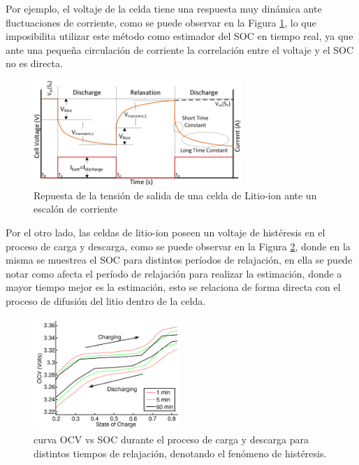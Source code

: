 \documentclass[10pt,a4paper]{article}
\begin{document}
\noindent Por ejemplo, el voltaje de la celda tiene una respuesta muy din\'amica
ante fluctuaciones de corriente, como se puede observar en la Figura
\ref{relaxation_ocv}, lo que imposibilita utilizar este m\'etodo como estimador
del \acrshort{SOC} en tiempo real, ya que ante una pequeña circulaci\'on de
corriente la correlaci\'on entre el voltaje y el \acrshort{SOC} no es directa.

\begin{figure}[h!]
    \begin{center}
        \includegraphics[width=0.7\textwidth]{ocv_relaxation.png}
        \caption{Repuesta de la tensi\'on de salida de una celda de Litio-ion
        ante un escal\'on de corriente}
        \label{relaxation_ocv}
    \end{center}
\end{figure}

\noindent Por el otro lado, las celdas de litio-ion poseen un voltaje de
hist\'eresis en el proceso de carga y descarga, como se puede observar en la
Figura \ref{histeresis_plot}, donde en la misma se muestrea el \acrshort{SOC}
para distintos per\'iodos de relajaci\'on, en ella se puede notar como
afecta el per\'iodo de relajaci\'on para realizar la estimaci\'on, donde a
mayor tiempo mejor es la estimaci\'on, esto se relaciona de forma directa con el
proceso de difusi\'on del litio dentro de la celda.

\begin{figure}[h!]
    \begin{center}
        \includegraphics[width=0.5\textwidth]{soc_histeresis.png}
        \caption{curva \acrshort{OCV} vs \acrshort{SOC} durante el proceso de
            carga y descarga para distintos tiempos de relajaci\'on, denotando
            el fen\'omeno de hist\'eresis.} 
        \label{histeresis_plot}
    \end{center}
\end{figure}
\end{document}
